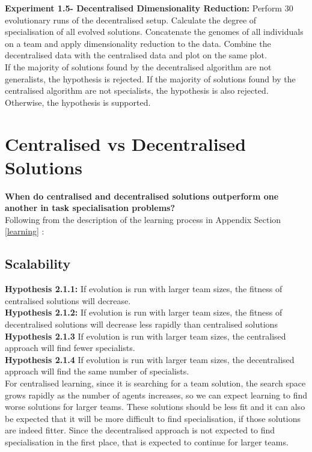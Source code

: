 \documentclass[12pt]{article}
\begin{document}
\textbf{Experiment 1.5- Decentralised Dimensionality Reduction:} Perform 30 evolutionary runs of the decentralised setup.
Calculate the degree of specialisation of all evolved solutions.
Concatenate the genomes of all individuals on a team and apply dimensionality reduction to the data.
Combine the decentralised data with the centralised data and plot on the same plot.\\

If the majority of solutions found by the decentralised algorithm are not generalists, the hypothesis is rejected.
If the majority of solutions found by the centralised algorithm are not specialists, the hypothesis is also rejected.
Otherwise, the hypothesis is supported.

\section{Centralised vs Decentralised Solutions}\label{centralised_vs_decentralised}

\textbf{When do centralised and decentralised solutions outperform one another in task specialisation problems?}\\

Following from the description of the learning process in Appendix Section \ref{learning} :\\

\subsection{Scalability}

\textbf{Hypothesis 2.1.1:} If evolution is run with larger team sizes, the fitness of centralised solutions will decrease.\\

\textbf{Hypothesis 2.1.2:} If evolution is run with larger team sizes, the fitness of decentralised solutions will decrease less rapidly than centralised solutions\\

\textbf{Hypothesis 2.1.3} If evolution is run with larger team sizes, the centralised approach will find fewer specialists.\\

\textbf{Hypothesis 2.1.4} If evolution is run with larger team sizes, the decentralised approach will find the same number of specialists.\\

For centralised learning, since it is searching for a team solution, the search space grows rapidly as the number of agents increases, so we can expect learning to find worse solutions for larger teams. 
These solutions should be less fit and it can also be expected that it will be more difficult to find specialisation, if those solutions are indeed fitter.
Since the decentralised approach is not expected to find specialisation in the first place, that is expected to continue for larger teams.\\
\end{document}
